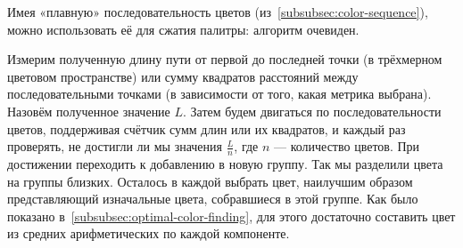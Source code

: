 Имея «плавную» последовательность цветов (из~\ref{subsubsec:color-sequence}),
можно использовать её для сжатия палитры: алгоритм очевиден.

Измерим полученную длину пути от первой до последней точки (в трёхмерном цветовом пространстве)
или сумму квадратов расстояний между последовательными точками (в зависимости от того, какая метрика выбрана).
Назовём полученное значение $L$.
Затем будем двигаться по последовательности цветов, поддерживая счётчик сумм длин или их квадратов,
и каждый раз проверять, не достигли ли мы значения $\frac{L}{n}$, где $n$ — количество цветов.
При достижении переходить к добавлению в новую группу.
Так мы разделили цвета на группы близких.
Осталось в каждой выбрать цвет, наилучшим образом представляющий изначальные цвета, собравшиеся в этой группе.
Как было показано в~\ref{subsubsec:optimal-color-finding}, для этого достаточно составить цвет из средних арифметических по каждой компоненте.